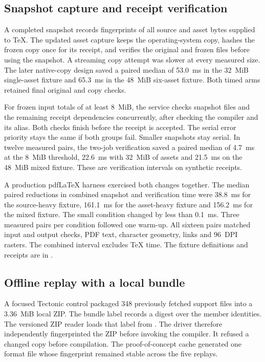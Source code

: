 \subsection{Snapshot capture and receipt verification}

A completed snapshot records fingerprints of all source and asset bytes
supplied to TeX. The updated asset capture keeps the operating-system
copy, hashes the frozen copy once for its receipt, and verifies the
original and frozen files before using the snapshot. A streaming copy
attempt was slower at every measured size. The later native-copy design
saved a paired median of 53.0~ms in the 32~MiB single-asset fixture and
65.3~ms in the 48~MiB six-asset fixture. Both timed arms retained final
original and copy checks.

For frozen input totals of at least 8~MiB, the service checks snapshot files
and the remaining receipt dependencies concurrently, after checking the
compiler and its alias. Both checks finish before the receipt is accepted.
The serial error priority stays the same if both groups fail. Smaller
snapshots stay serial. In twelve measured pairs, the two-job verification
saved a paired median of 4.7~ms at the 8~MiB threshold, 22.6~ms with
32~MiB of assets and 21.5~ms on the 48~MiB mixed fixture. These are
verification intervals on synthetic receipts.

A production pdf\LaTeX{} harness exercised both changes together. The
median paired reductions in combined snapshot and verification time were
38.8~ms for the source-heavy fixture, 161.1~ms for the asset-heavy
fixture and 156.2~ms for the mixed fixture. The small condition changed
by less than 0.1~ms. Three measured pairs per condition followed one
warm-up. All sixteen pairs matched input and output checks, PDF text,
character geometry, links and 96~DPI rasters. The combined interval excludes
TeX time. The fixture definitions and receipts are in
.


\subsection{Offline replay with a local bundle}

A focused Tectonic control packaged 348 previously fetched support files
into a 3.36~MiB local ZIP. The bundle label records a digest over the member
identities. The versioned ZIP reader loads that label from
 \cite{tectoniczip}. The driver therefore independently
fingerprinted the ZIP before invoking the compiler. It refused a changed
copy before compilation. The proof-of-concept cache generated one format
file whose fingerprint remained stable across the five replays.


